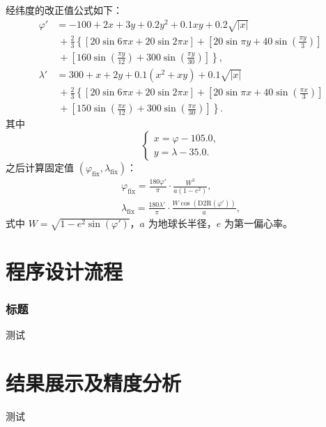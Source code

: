 \documentclass[10pt,xcolor=dvipsnames,fontset=none,punct=CCT]{ctexbeamer}
\begin{document}
\begin{frame}[allowframebreaks]
  经纬度的改正值公式如下：
  \begin{align*}
    \varphi' &=-100+2x+3y+0.2y^2+0.1xy+0.2\sqrt{|x|}\\
    &\ {}+\frac23\left\{[20\sin 6\pi x+20\sin 2\pi x]+\left[20\sin \pi y+40\sin\left(\frac{\pi y}{3}\right)\right]\right.\\
    &\left.\ {}+\left[160\sin\left(\frac{\pi y}{12}\right)+300\sin\left(\frac{\pi y}{30}\right)\right]\right\},\\
    \lambda' &=300+x+2y+0.1(x^2+xy)+0.1\sqrt{|x|}\\
    &\ {}+\frac23\left\{[20\sin 6\pi x+20\sin 2\pi x]+\left[20\sin \pi x+40\sin\left(\frac{\pi x}{3}\right)\right]\right.\\
    &\left.\ {}+\left[150\sin\left(\frac{\pi x}{12}\right)+300\sin\left(\frac{\pi x}{30}\right)\right]\right\}.
  \end{align*}
  其中
  \begin{equation*}
  \begin{cases}
      x=\varphi-105.0,\\
      y=\lambda- 35.0.
  \end{cases}
  \end{equation*}
  之后计算固定值 $(\varphi_\mathrm{fix},\lambda_\mathrm{fix})$：
  \begin{gather*}
  \varphi_\mathrm{fix}=\frac{180\varphi'}{\pi}\cdot\frac{W^3}{a(1-e^2)},\\
  \lambda_\mathrm{fix}=\frac{180\lambda'}{\pi}\cdot\frac{W\cos\left(\mathrm{D2R}(\varphi')\right)}{a},
  \end{gather*}
  式中 $W=\sqrt{1-e^2\sin(\varphi')}$，$a$ 为地球长半径，$e$ 为第一偏心率。
\end{frame}

\section{程序设计流程}
\begin{frame}
  \frametitle{标题}
  测试
\end{frame}

\section{结果展示及精度分析}
\begin{frame}
  测试
\end{frame}
\end{document}
